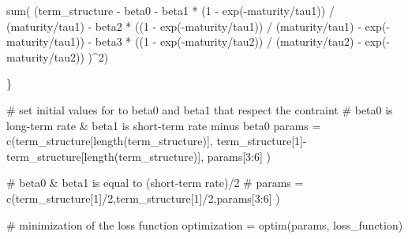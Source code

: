 \documentclass[
  a4paper,
  DIV=11,
  numbers=noendperiod]{scrreprt}
\newenvironment{Shaded}{\begin{snugshade}}{\end{snugshade}}
\newcommand{\CommentTok}[1]{\textcolor[rgb]{0.37,0.37,0.37}{#1}}
\newcommand{\DecValTok}[1]{\textcolor[rgb]{0.68,0.00,0.00}{#1}}
\newcommand{\FunctionTok}[1]{\textcolor[rgb]{0.28,0.35,0.67}{#1}}
\newcommand{\NormalTok}[1]{\textcolor[rgb]{0.00,0.23,0.31}{#1}}
\newcommand{\OtherTok}[1]{\textcolor[rgb]{0.00,0.23,0.31}{#1}}
\newcommand{\SpecialCharTok}[1]{\textcolor[rgb]{0.37,0.37,0.37}{#1}}
\begin{document}
\begin{Shaded}
\begin{Highlighting}[]
    \FunctionTok{sum}\NormalTok{(}
\NormalTok{      (term\_structure }\SpecialCharTok{{-}}\NormalTok{ beta0 }\SpecialCharTok{{-}} 
\NormalTok{         beta1 }\SpecialCharTok{*}\NormalTok{  (}\DecValTok{1} \SpecialCharTok{{-}} \FunctionTok{exp}\NormalTok{(}\SpecialCharTok{{-}}\NormalTok{maturity}\SpecialCharTok{/}\NormalTok{tau1)) }\SpecialCharTok{/}\NormalTok{ (maturity}\SpecialCharTok{/}\NormalTok{tau1) }\SpecialCharTok{{-}}
\NormalTok{         beta2 }\SpecialCharTok{*}\NormalTok{ ((}\DecValTok{1} \SpecialCharTok{{-}} \FunctionTok{exp}\NormalTok{(}\SpecialCharTok{{-}}\NormalTok{maturity}\SpecialCharTok{/}\NormalTok{tau1)) }\SpecialCharTok{/}\NormalTok{ (maturity}\SpecialCharTok{/}\NormalTok{tau1) }\SpecialCharTok{{-}} \FunctionTok{exp}\NormalTok{(}\SpecialCharTok{{-}}\NormalTok{maturity}\SpecialCharTok{/}\NormalTok{tau1)) }\SpecialCharTok{{-}} 
\NormalTok{         beta3 }\SpecialCharTok{*}\NormalTok{ ((}\DecValTok{1} \SpecialCharTok{{-}} \FunctionTok{exp}\NormalTok{(}\SpecialCharTok{{-}}\NormalTok{maturity}\SpecialCharTok{/}\NormalTok{tau2)) }\SpecialCharTok{/}\NormalTok{ (maturity}\SpecialCharTok{/}\NormalTok{tau2) }\SpecialCharTok{{-}} \FunctionTok{exp}\NormalTok{(}\SpecialCharTok{{-}}\NormalTok{maturity}\SpecialCharTok{/}\NormalTok{tau2)) }
\NormalTok{      )}\SpecialCharTok{\^{}}\DecValTok{2}\NormalTok{)}
    
\NormalTok{  \}}
  
  \CommentTok{\# set initial values for to beta0 and beta1 that respect the contraint }
  \CommentTok{\# beta0 is long{-}term rate \& beta1 is short{-}term rate minus beta0}
\NormalTok{  params }\OtherTok{=} \FunctionTok{c}\NormalTok{(term\_structure[}\FunctionTok{length}\NormalTok{(term\_structure)],}
\NormalTok{             term\_structure[}\DecValTok{1}\NormalTok{]}\SpecialCharTok{{-}}\NormalTok{term\_structure[}\FunctionTok{length}\NormalTok{(term\_structure)],}
\NormalTok{             params[}\DecValTok{3}\SpecialCharTok{:}\DecValTok{6}\NormalTok{] )}
               
  \CommentTok{\# beta0 \& beta1 is equal to (short{-}term rate)/2}
  \CommentTok{\# params = c(term\_structure[1]/2,term\_structure[1]/2,params[3:6] )}
  
  \CommentTok{\# minimization of the loss function }
\NormalTok{  optimization }\OtherTok{=} \FunctionTok{optim}\NormalTok{(params, loss\_function)}
  

\end{Highlighting}
\end{Shaded}
\end{document}
